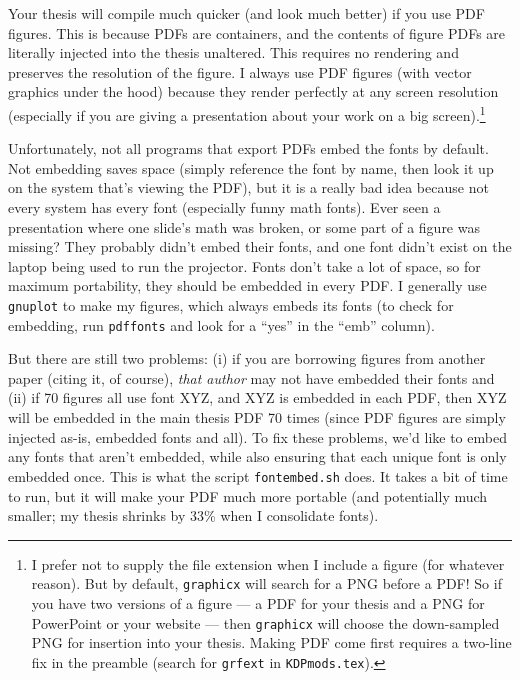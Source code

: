 \documentclass{iitthesis}
\begin{document}
Your thesis will compile much quicker (and look much better) if you use PDF figures.
This is because PDFs are containers, and the contents of figure PDFs
are literally injected into the thesis unaltered. 
This requires no rendering and preserves the resolution of the figure. 
I always use PDF figures (with vector graphics under the hood)
because they render perfectly at any screen resolution
(especially if you are giving a presentation about your work on a big screen).\footnote
{\nobreak %
	I prefer not to supply the file extension when I include a figure
	(for whatever reason).
	But by default, {\tt graphicx} will search for a PNG before a PDF! 
	So if you have two versions of a figure
	--- a PDF for your thesis and a PNG for PowerPoint or your website ---
	then {\tt graphicx} will choose the down-sampled PNG for insertion into your thesis. 
	Making PDF come first requires a two-line fix in the preamble 
	(search for {\tt grfext} in {\tt KDPmods.tex}).
}

Unfortunately, not all programs that export PDFs embed the fonts by default. 
Not embedding saves space (simply reference the font by name, 
then look it up on the system that's viewing the PDF),
but it is a really bad idea because not every system has every font (especially funny math fonts).
Ever seen a presentation where one slide's math was broken, 
or some part of a figure was missing? They probably didn't embed their fonts, 
and one font didn't exist on the laptop being used to run the projector.
Fonts don't take a lot of space, so for maximum portability, 
they should be embedded in every PDF.
I generally use {\tt gnuplot} to make my figures, which always embeds its fonts
(to check for embedding, run {\tt pdffonts} and look for a ``yes'' in the ``emb'' column).

But there are still two problems:
(i) if you are borrowing figures from another paper (citing it, of course), 
\emph{that author} may not have embedded their fonts and 
(ii) if 70 figures all use font XYZ, and XYZ is embedded in each PDF,
then XYZ will be embedded in the main thesis PDF 70 times 
(since PDF figures are simply injected as-is, embedded fonts and all).
To fix these problems, we'd like to embed any fonts that aren't embedded, 
while also ensuring that each unique font is only embedded once.
This is what the script {\tt fontembed.sh} does.
It takes a bit of time to run, but it will make your PDF much more portable
(and potentially much smaller; my thesis shrinks by 33\% when I consolidate fonts).
\end{document}
